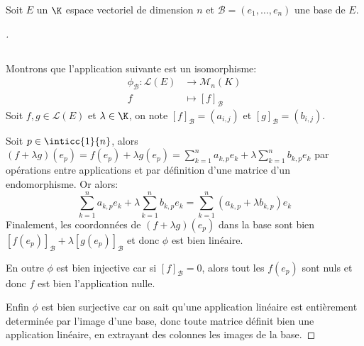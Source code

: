 \documentclass{report}
\begin{document}
Soit \(E\) un \(\K\) espace vectoriel de dimension \(n\) et \(\mathscr{B}= (e_1, \ldots, e_n)\) une base de \(E\).
   \begin{proof}[\unskip\nopunct]
      \subsection*{}
      Montrons que l'application suivante est un isomorphisme:
      \[
         \begin{aligned}
            \phi_\mathscr{B}: \mathcal{L}(E) &\longrightarrow \mathcal{M}_n(K)\\
            f &\longmapsto [f]_\mathscr{B}
         \end{aligned}
      \]
      Soit \(f, g \in \mathcal{L}(E)\) et \(\lambda \in \K\), on note \([f]_\mathscr{B} = (a_{i, j})\) et \([g]_\mathscr{B} = (b_{i, j})\).\<

      Soit \(p \in \inticc{1}{n}\), alors \((f + \lambda g)(e_p) = f(e_p) + \lambda g(e_p) = \sum_{k=1}^n a_{k, p}e_k + \lambda \sum_{k=1}^n b_{k, p}e_k\) par opérations entre applications et par définition d'une matrice d'un endomorphisme. Or alors:
      \[
         \sum_{k=1}^n a_{k, p}e_k + \lambda \sum_{k=1}^n b_{k, p}e_k = \sum_{k=1}^n (a_{k, p} + \lambda b_{k, p}) e_k
      \]
      Finalement, les coordonnées de \((f + \lambda g)(e_p)\) dans la base sont bien \([f(e_p)]_\mathscr{B} + \lambda [g(e_p)]_\mathscr{B}\) et donc \(\phi\) est bien linéaire.\<

      En outre \(\phi\) est bien injective car si \([f]_\mathscr{B} = 0\), alors tout les \(f(e_p)\) sont nuls et donc \(f\) est bien l'application nulle. \<

      Enfin \(\phi\) est bien surjective car on sait qu'une application linéaire est entièrement determinée par l'image d'une base, donc toute matrice définit bien une application linéaire, en extrayant des colonnes les images de la base.
   \end{proof}
\end{document}
